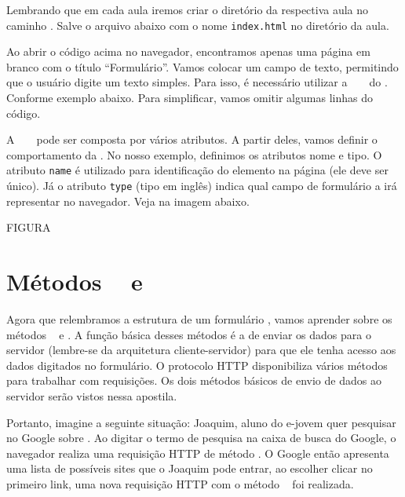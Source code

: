 

Lembrando que em cada aula iremos criar o diretório da respectiva aula no caminho
. Salve o arquivo abaixo com o nome \texttt{index.html} no
diretório da aula.



Ao abrir o código acima no navegador, encontramos apenas uma página em branco com o 
título ``Formulário''. Vamos colocar um campo de texto, permitindo que o usuário digite 
um texto simples. Para isso, é necessário utilizar a \tag~ \taginput~ do \html. Conforme 
exemplo abaixo. Para simplificar, vamos omitir algumas linhas do código.



A \tag~ \taginput~ pode ser composta por vários atributos. A partir deles, vamos definir o 
comportamento da \tag. No nosso exemplo, definimos os atributos nome e tipo. O atributo
\texttt{name} é utilizado para identificação do elemento na página (ele deve ser único). 
Já o atributo \texttt{type} (tipo em inglês) indica qual campo de formulário a \tag \taginput 
irá representar no navegador. Veja na imagem abaixo.

FIGURA

\section{Métodos \metodoGET~ e \metodoPOST}
Agora que relembramos a estrutura de um formulário \html, vamos aprender sobre os métodos
\metodoGET~ e \metodoPOST. A função básica desses métodos é a de enviar os dados para 
o servidor (lembre-se da arquitetura cliente-servidor) para que ele tenha acesso aos 
dados digitados no formulário. O protocolo HTTP disponibiliza vários métodos para 
trabalhar com requisições. Os dois métodos básicos de envio de dados ao servidor serão 
vistos nessa apostila.

Portanto, imagine a seguinte situação: Joaquim, aluno do e-jovem quer pesquisar no Google 
sobre \php. Ao digitar o termo de pesquisa na caixa de busca do Google, o navegador realiza 
uma requisição HTTP de método \metodoGET. O Google então apresenta uma lista de possíveis 
sites que o Joaquim pode entrar, ao escolher clicar no primeiro link, uma nova requisição 
HTTP com o método \metodoGET~ foi realizada.

